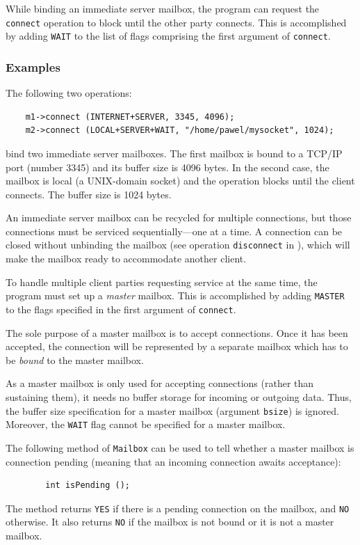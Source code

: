 While binding an immediate server mailbox, the program can
request the {\tt connect} operation to block until the other party connects.
This is accomplished by adding {\tt WAIT} to the list of flags
comprising the first argument of {\tt connect}.

\subsubsection*{Examples}

\noindent
The following two operations:
\begin{verbatim}
    m1->connect (INTERNET+SERVER, 3345, 4096);
    m2->connect (LOCAL+SERVER+WAIT, "/home/pawel/mysocket", 1024);
\end{verbatim}
bind two immediate server mailboxes.
The first mailbox is bound to a TCP/IP port (number 3345) and its buffer
size is 4096 bytes.
In the second case, the mailbox is local (a UNIX-domain socket) and the
operation blocks until the client connects.
The buffer size is 1024 bytes.

\medskip

\noindent
An immediate server mailbox can be recycled for multiple connections,
but those connections must be serviced sequentially---one at a time.
A connection can be closed without unbinding the
mailbox (see operation {\tt disconnect} in ),
which will make the mailbox ready to accommodate another client.

To handle multiple client parties requesting
service at the same time, the program must set up a {\em master\/} mailbox.
This is accomplished by adding {\tt MASTER} to the flags specified in the
first argument of {\tt connect}.

The sole purpose of a master mailbox is to accept connections.
Once it has been accepted, the connection will be represented by a
separate mailbox which has to be {\em bound\/} to the master mailbox.

As a master mailbox is only used for accepting connections (rather
than sustaining them), it needs no buffer storage for incoming or
outgoing data.
Thus, the buffer size specification for a master mailbox
(argument {\tt bsize}) is ignored.
Moreover, the {\tt WAIT} flag cannot be specified for a master mailbox.

The following method of {\tt Mailbox} can be used to tell whether
a master mailbox is connection pending (meaning that an incoming
connection awaits acceptance):
\begin{verbatim}
        int isPending ();
\end{verbatim}
The method returns {\tt YES} if there is a pending connection on the mailbox,
and {\tt NO} otherwise.
It also returns {\tt NO} if the mailbox is not bound or it is not a
master mailbox.

